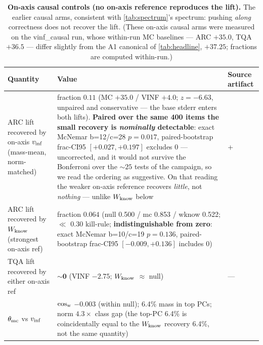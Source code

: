 \begin{table}[tbp]
\centering
\begin{threeparttable}
\caption{\textbf{On-axis causal controls (no on-axis reference reproduces the
lift).} The earlier causal arms, consistent with \cref{tab:spectrum}'s spectrum:
pushing \emph{along} correctness does not recover the lift. (These on-axis causal
arms were measured on the vinf\_causal run, whose within-run MC baselines --- ARC
$+35.0$, TQA $+36.5$ --- differ slightly from the A1 canonical of
\cref{tab:headline}, $+37.25$; fractions are computed within-run.)}
\label{tab:onaxis}
\footnotesize
\begin{tabular}{L{5.4cm} L{6.6cm} L{2.8cm}}
\toprule
Quantity & Value & Source artifact \\
\midrule
ARC lift recovered by on-axis $v_{\mathrm{inf}}$ (mass-mean, norm-matched) & fraction
$\mathbf{0.11}$ (MC $+35.0$ / VINF $+4.0$; $z = -6.63$, unpaired and conservative
--- the base stderr enters both lifts). \textbf{Paired over the same 400 items the
small recovery is \emph{nominally} detectable}: exact McNemar b=12/c=28 $p=0.017$,
paired-bootstrap
frac-CI95 $[+0.027, +0.197]$ excludes 0 --- uncorrected, and it would not survive
the Bonferroni over the ${\sim}25$ tests of the campaign, so we read the ordering as
suggestive. On that reading the weaker on-axis reference recovers
\emph{little}, not \emph{nothing} --- unlike $W_{\mathrm{know}}$ below &
 +
 \\
ARC lift recovered by $W_{\mathrm{know}}$ (strongest on-axis ref) & fraction $\mathbf{0.064}$
(null 0.500 / mc 0.853 / wknow 0.522; ${\ll}$ 0.30 kill-rule;
\textbf{indistinguishable from zero}: exact McNemar b=10/c=19 $p=0.136$,
paired-bootstrap frac-CI95 $[-0.009, +0.136]$ includes 0) &
 \\
TQA lift recovered by either on-axis ref & $\mathbf{{\sim}0}$ (VINF $-2.75$;
$W_{\mathrm{know}}$ ${\approx}$ null) & --- \\
$\theta_{\mathrm{mc}}$ vs $v_{\mathrm{inf}}$ & $\cos_{\mathrm{w}}$ $\mathbf{-0.003}$ (within null); 6.4\% mass in top
PCs; norm $4.3\times$ class gap (the top-PC 6.4\% is coincidentally equal to the
$W_{\mathrm{know}}$ recovery 6.4\%, not the same quantity) &
 \\

\end{tabular}
\end{threeparttable}
\end{table}
